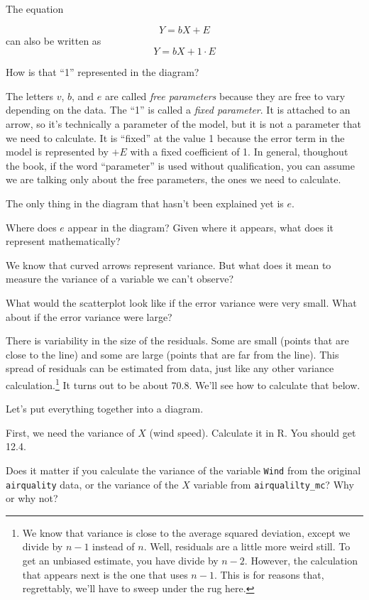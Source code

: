 \documentclass[
]{book}
\begin{document}
The equation

\[
Y = bX + E
\]
can also be written as
\[
Y = bX + 1 \cdot E
\]

How is that ``1'' represented in the diagram?

The letters \(v\), \(b\), and \(e\) are called \emph{free parameters} because they are free to vary depending on the data. The ``1'' is called a \emph{fixed parameter}. It is attached to an arrow, so it's technically a parameter of the model, but it is not a parameter that we need to calculate. It is ``fixed'' at the value 1 because the error term in the model is represented by \(+E\) with a fixed coefficient of 1. In general, thoughout the book, if the word ``parameter'' is used without qualification, you can assume we are talking only about the free parameters, the ones we need to calculate.

The only thing in the diagram that hasn't been explained yet is \(e\).

Where does \(e\) appear in the diagram? Given where it appears, what does it represent mathematically?

We know that curved arrows represent variance. But what does it mean to measure the variance of a variable we can't observe?

What would the scatterplot look like if the error variance were very small. What about if the error variance were large?

There is variability in the size of the residuals. Some are small (points that are close to the line) and some are large (points that are far from the line). This spread of residuals can be estimated from data, just like any other variance calculation.\footnote{We know that variance is close to the average squared deviation, except we divide by \(n - 1\) instead of \(n\). Well, residuals are a little more weird still. To get an unbiased estimate, you have divide by \(n - 2\). However, the calculation that appears next is the one that uses \(n - 1\). This is for reasons that, regrettably, we'll have to sweep under the rug here.} It turns out to be about 70.8. We'll see how to calculate that below.

Let's put everything together into a diagram.

First, we need the variance of \(X\) (wind speed). Calculate it in R. You should get 12.4.

Does it matter if you calculate the variance of the variable \texttt{Wind} from the original \texttt{airquality} data, or the variance of the \(X\) variable from \texttt{airqualilty\_mc}? Why or why not?
\end{document}
